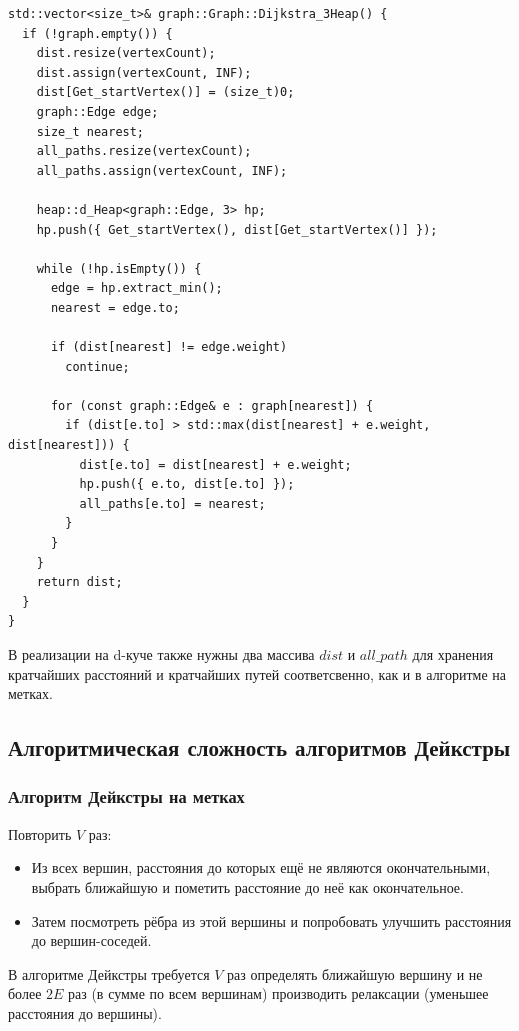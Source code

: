 \begin{text}
\begin{lstlisting}[breaklines=true]
std::vector<size_t>& graph::Graph::Dijkstra_3Heap() {
  if (!graph.empty()) {
    dist.resize(vertexCount);
    dist.assign(vertexCount, INF);
    dist[Get_startVertex()] = (size_t)0;
    graph::Edge edge;
    size_t nearest;
    all_paths.resize(vertexCount);
    all_paths.assign(vertexCount, INF);
  
    heap::d_Heap<graph::Edge, 3> hp;
    hp.push({ Get_startVertex(), dist[Get_startVertex()] });
  
    while (!hp.isEmpty()) {
      edge = hp.extract_min();
      nearest = edge.to;
  
      if (dist[nearest] != edge.weight)
        continue;
  
      for (const graph::Edge& e : graph[nearest]) {
        if (dist[e.to] > std::max(dist[nearest] + e.weight, dist[nearest])) {
          dist[e.to] = dist[nearest] + e.weight;
          hp.push({ e.to, dist[e.to] });
          all_paths[e.to] = nearest;
        }
      }
    }
    return dist;
  }
}
\end{lstlisting}

В реализации на d-куче также нужны два массива $dist$ и $all\_path$ для хранения кратчайших расстояний и кратчайших путей соответсвенно, как и в алгоритме на метках.

\newpage
\subsection{Алгоритмическая сложность алгоритмов Дейкстры}


\subsubsection{Алгоритм Дейкстры на метках}

Повторить $V$ раз:
\begin{itemize}
	\item Из всех вершин, расстояния до которых ещё не являются окончательными, выбрать ближайшую и пометить расстояние до неё как окончательное.
	\item Затем посмотреть рёбра из этой вершины и попробовать улучшить расстояния до вершин-соседей.
\end{itemize}

В алгоритме Дейкстры требуется $V$ раз определять ближайшую вершину и не более $2E$ раз (в сумме по всем вершинам) производить релаксации (уменьшее расстояния до вершины).\\


\end{text}
